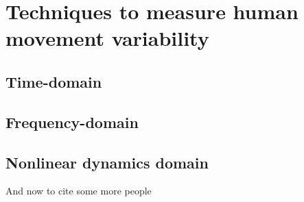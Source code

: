 \chapter{Techniques to measure human movement variability}

\ifpdf
    \graphicspath{{Chapter3/Figs/Raster/}{Chapter3/Figs/PDF/}{Chapter3/Figs/}}
\else
    \graphicspath{{Chapter3/Figs/Vector/}{Chapter3/Figs/}}
\fi


\section{Time-domain}
\section{Frequency-domain}
\section{Nonlinear dynamics domain}
And now to cite some more people~\citet{Rea85,Ancey1996}
